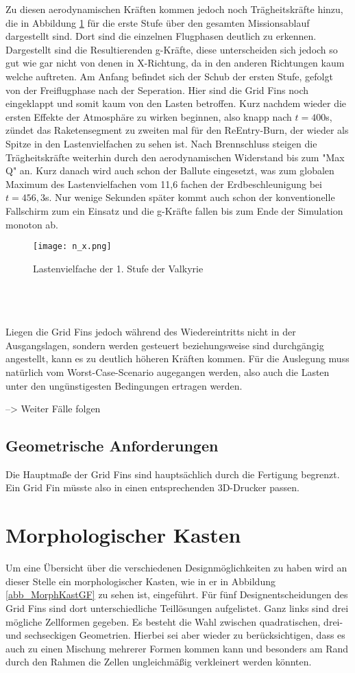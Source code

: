 Zu diesen aerodynamischen Kräften kommen jedoch noch Trägheitskräfte hinzu, die in Abbildung \ref{abb_n_x} für die erste Stufe über den gesamten Missionsablauf dargestellt sind. Dort sind die einzelnen Flugphasen deutlich zu erkennen. Dargestellt sind die Resultierenden g-Kräfte, diese unterscheiden sich jedoch so gut wie gar nicht von denen in X-Richtung, da in den anderen Richtungen kaum welche auftreten. Am Anfang befindet sich der Schub der ersten Stufe, gefolgt von der Freiflugphase nach der Seperation. Hier sind die Grid Fins noch eingeklappt und somit kaum von den Lasten betroffen. Kurz nachdem wieder die ersten Effekte der Atmosphäre zu wirken beginnen, also knapp nach $t=400$s, zündet das Raketensegment zu zweiten mal für den ReEntry-Burn, der wieder als Spitze in den Lastenvielfachen zu sehen ist. Nach Brennschluss steigen die Trägheitskräfte weiterhin durch den aerodynamischen Widerstand bis zum "Max Q" an. Kurz danach wird auch schon der Ballute eingesetzt, was zum globalen Maximum des Lastenvielfachen vom 11,6 fachen der Erdbeschleunigung bei $t=456,3$s. Nur wenige Sekunden später kommt auch schon der konventionelle Fallschirm zum ein Einsatz und die g-Kräfte fallen bis zum Ende der Simulation monoton ab.
\begin{figure}[h]
	\centering
	\texttt{[image: n\_x.png]}
	\caption{Lastenvielfache der 1. Stufe der Valkyrie}
	\label{abb_n_x}
\end{figure}\\
\\~\\
Liegen die Grid Fins jedoch während des Wiedereintritts nicht in der Ausgangslagen, sondern werden gesteuert beziehungsweise sind durchgängig angestellt, kann es zu deutlich höheren Kräften kommen. Für die Auslegung muss natürlich vom Worst-Case-Scenario augegangen werden, also auch die Lasten unter den ungünstigesten Bedingungen ertragen werden.

--> Weiter Fälle folgen
\subsection{Geometrische Anforderungen}
Die Hauptmaße der Grid Fins sind hauptsächlich durch die Fertigung begrenzt. Ein Grid Fin müsste also in einen entsprechenden 3D-Drucker passen.

\section{Morphologischer Kasten}
Um eine Übersicht über die verschiedenen Designmöglichkeiten zu haben wird an dieser Stelle ein morphologischer Kasten, wie in er in Abbildung \ref{abb_MorphKastGF} zu sehen ist, eingeführt. Für fünf Designentscheidungen des Grid Fins sind dort unterschiedliche Teillösungen aufgelistet. Ganz links sind drei mögliche Zellformen gegeben. Es besteht die Wahl zwischen quadratischen, drei- und sechseckigen Geometrien. Hierbei sei aber wieder zu berücksichtigen, dass es auch zu einen Mischung mehrerer Formen kommen kann und besonders am Rand durch den Rahmen die Zellen ungleichmäßig verkleinert werden könnten.

